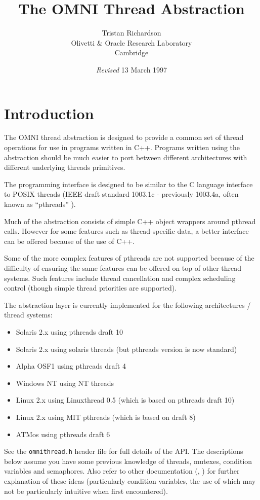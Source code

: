 \documentclass[11pt,twoside,onecolumn]{article}
\title{The OMNI Thread Abstraction}
\author{Tristan Richardson\\
Olivetti \& Oracle Research Laboratory \\
Cambridge \\
}
\date{{\it Revised} 13 March 1997}
\begin{document}
\maketitle

\section{Introduction}

The OMNI thread abstraction is designed to provide a common set of thread
operations for use in programs written in C++.  Programs written using the
abstraction should be much easier to port between different architectures with
different underlying threads primitives.

The programming interface is designed to be similar to the C language interface
to POSIX threads (IEEE draft standard 1003.1c - previously 1003.4a, often known
as ``pthreads'' \cite{pthreads}).

Much of the abstraction consists of simple C++ object wrappers around pthread
calls.  However for some features such as thread-specific data, a better
interface can be offered because of the use of C++.

Some of the more complex features of pthreads are not supported because of the
difficulty of ensuring the same features can be offered on top of other thread
systems.  Such features include thread cancellation and complex scheduling
control (though simple thread priorities are supported).

The abstraction layer is currently implemented for the following architectures
/ thread systems:

\begin{itemize}

\item Solaris 2.x using pthreads draft 10
\item Solaris 2.x using solaris threads (but pthreads version is now standard)
\item Alpha OSF1 using pthreads draft 4
\item Windows NT using NT threads
\item Linux 2.x using Linuxthread 0.5 (which is based on pthreads draft 10)
\item Linux 2.x using MIT pthreads (which is based on draft 8)
\item ATMos using pthreads draft 6

\end{itemize}

See the {\tt omnithread.h} header file for full details of the API.  The
descriptions below assume you have some previous knowledge of threads, mutexes,
condition variables and semaphores.  Also refer to other documentation
(\cite{birrell}, \cite{pthreads}) for further explanation of these ideas
(particularly condition variables, the use of which may not be particularly
intuitive when first encountered).
\end{document}
